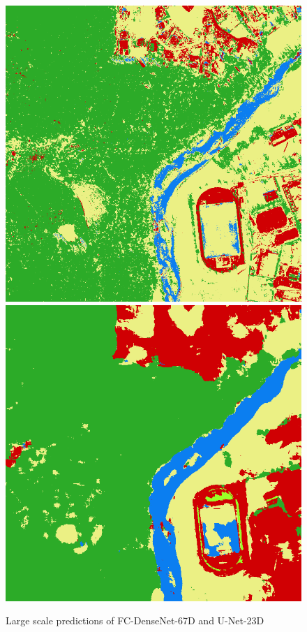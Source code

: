 \begin{figure}
    \includegraphics[width=\DiscussionImageWidth]{images/segmentation_discussion/densenet/3.png} \hfill
    \includegraphics[width=\DiscussionImageWidth]{images/segmentation_discussion/unet/3.png}

    \caption{Large scale predictions of FC-DenseNet-67D and U-Net-23D}
    \label{fig:segmentation_discussion}
\end{figure}

